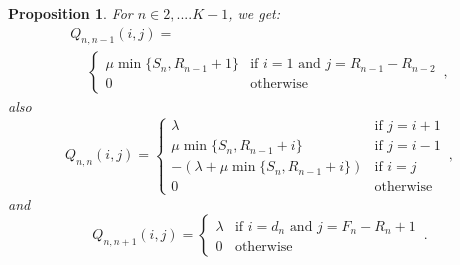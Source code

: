 \documentclass[conference]{IEEEtran}
\newtheorem{prosi}{Proposition}
\begin{document}
\begin{prosi}
For $n \in {2,....K-1}$, we get:
\begin{multline*}
Q_{n,n-1}(i,j)= \\
\quad \ 
\begin{cases}
\mu \min\{S_{n},R_{n-1}\!+\!1\}  & \text{if } i= \! 1 \text{ and } j= \! R_{n-1} \! - \! R_{n-2}\\
0 & \text{otherwise}
\end{cases}\, ,
\end{multline*}
also
\begin{equation*}
Q_{n,n}(i,j) = 
\begin{cases}
\lambda                                 & \text{if } j=i+1\\
\mu \min\{S_{n},R_{n-1}+i\}             & \mbox{if } j=i-1\\
-(\lambda+\mu \min\{S_{n},R_{n-1}+i\})  & \text{if } i=j\\
0                                       & \text{otherwise}
\end{cases}\, ,
\end{equation*}
and
\begin{equation*}
Q_{n,n+1}(i,j) = 
\begin{cases}
\lambda             & \text{if } i=d_{n} \text{ and } j=F_{n}-R_{n}+1\\
0                   & \mbox{otherwise}
\end{cases}\, .
\end{equation*}


\end{prosi}
\end{document}
